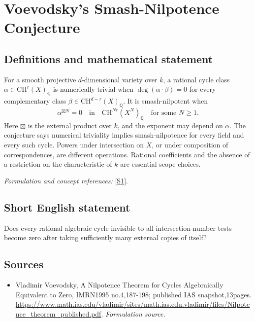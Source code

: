 \documentclass[11pt]{article}
\begin{document}
\section*{\texorpdfstring{Voevodsky's Smash-Nilpotence Conjecture}{Voevodsky's Smash-Nilpotence Conjecture}}\label{statement}
\subsection{Definitions and mathematical statement}
For a smooth projective $d$-dimensional variety over $k$, a rational cycle class $\alpha\in\mathrm{CH}^r(X)_{{\mathbb{Q}}}$ is numerically trivial when
$\deg(\alpha\cdot\beta)=0$ for every complementary class $\beta\in\mathrm{CH}^{d-r}(X)_{{\mathbb{Q}}}$. It is smash-nilpotent when
\[
 \alpha^{\boxtimes N}=0\quad\text{in}\quad\mathrm{CH}^{Nr}(X^N)_{{\mathbb{Q}}}
 \quad\text{for some }N\ge1.
\]
Here $\boxtimes$ is the external product over $k$, and the exponent may depend on $\alpha$. The conjecture says numerical triviality implies smash-nilpotence for every field and every such cycle. Powers under intersection on $X$, or under composition of correspondences, are different operations. Rational coefficients and the absence of a restriction on the characteristic of $k$ are essential scope choices.
\par\smallskip\textit{Formulation and concept references:} \href{https://www.math.ias.edu/vladimir/sites/math.ias.edu.vladimir/files/Nilpotence_theorem_published.pdf}{[S1]}.

\subsection{Short English statement}
Does every rational algebraic cycle invisible to all intersection-number tests become zero after taking sufficiently many external copies of itself?
\subsection{Sources}
\begin{itemize}
\item[S1]Vladimir Voevodsky, A Nilpotence Theorem for Cycles Algebraically Equivalent to Zero, IMRN1995 no.4,187-198; published IAS snapshot,13pages.
\url{https://www.math.ias.edu/vladimir/sites/math.ias.edu.vladimir/files/Nilpotence_theorem_published.pdf}.
\textit{Formulation source.}
\end{itemize}
\end{document}

